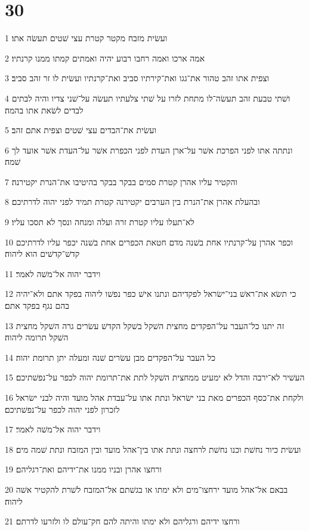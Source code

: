 \chapter{30}

\par 1 ועשׂית מזבח מקטר קטרת עצי שׁטים תעשׂה אתו׃
\par 2 אמה ארכו ואמה רחבו רבוע יהיה ואמתים קמתו ממנו קרנתיו׃
\par 3 וצפית אתו זהב טהור את־גגו ואת־קירתיו סביב ואת־קרנתיו ועשׂית לו זר זהב סביב׃
\par 4 ושׁתי טבעת זהב תעשׂה־לו מתחת לזרו על שׁתי צלעתיו תעשׂה על־שׁני צדיו והיה לבתים לבדים לשׂאת אתו בהמה׃
\par 5 ועשׂית את־הבדים עצי שׁטים וצפית אתם זהב׃
\par 6 ונתתה אתו לפני הפרכת אשׁר על־ארן העדת לפני הכפרת אשׁר על־העדת אשׁר אועד לך שׁמה׃
\par 7 והקטיר עליו אהרן קטרת סמים בבקר בבקר בהיטיבו את־הנרת יקטירנה׃
\par 8 ובהעלת אהרן את־הנרת בין הערבים יקטירנה קטרת תמיד לפני יהוה לדרתיכם׃
\par 9 לא־תעלו עליו קטרת זרה ועלה ומנחה ונסך לא תסכו עליו׃
\par 10 וכפר אהרן על־קרנתיו אחת בשׁנה מדם חטאת הכפרים אחת בשׁנה יכפר עליו לדרתיכם קדשׁ־קדשׁים הוא ליהוה׃
\par 11 וידבר יהוה אל־משׁה לאמר׃
\par 12 כי תשׂא את־ראשׁ בני־ישׂראל לפקדיהם ונתנו אישׁ כפר נפשׁו ליהוה בפקד אתם ולא־יהיה בהם נגף בפקד אתם׃
\par 13 זה יתנו כל־העבר על־הפקדים מחצית השׁקל בשׁקל הקדשׁ עשׂרים גרה השׁקל מחצית השׁקל תרומה ליהוה׃
\par 14 כל העבר על־הפקדים מבן עשׂרים שׁנה ומעלה יתן תרומת יהוה׃
\par 15 העשׁיר לא־ירבה והדל לא ימעיט ממחצית השׁקל לתת את־תרומת יהוה לכפר על־נפשׁתיכם׃
\par 16 ולקחת את־כסף הכפרים מאת בני ישׂראל ונתת אתו על־עבדת אהל מועד והיה לבני ישׂראל לזכרון לפני יהוה לכפר על־נפשׁתיכם׃
\par 17 וידבר יהוה אל־משׁה לאמר׃
\par 18 ועשׂית כיור נחשׁת וכנו נחשׁת לרחצה ונתת אתו בין־אהל מועד ובין המזבח ונתת שׁמה מים׃
\par 19 ורחצו אהרן ובניו ממנו את־ידיהם ואת־רגליהם׃
\par 20 בבאם אל־אהל מועד ירחצו־מים ולא ימתו או בגשׁתם אל־המזבח לשׁרת להקטיר אשׁה ליהוה׃
\par 21 ורחצו ידיהם ורגליהם ולא ימתו והיתה להם חק־עולם לו ולזרעו לדרתם׃
